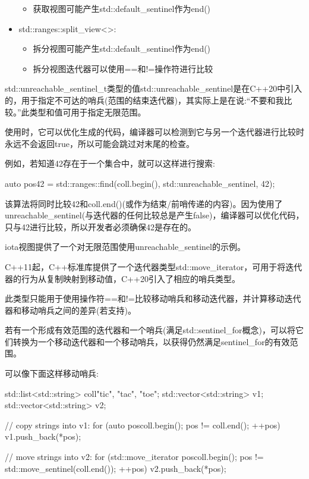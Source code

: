 \begin{itemize}
\begin{itemize}
\item
获取视图可能产生std::default\_sentinel作为end()
\end{itemize}

\item
std::ranges::split\_view<>:

\begin{itemize}
\item
拆分视图可能产生std::default\_sentinel作为end()

\item
拆分视图迭代器可以使用==和!=操作符进行比较
\end{itemize}
\end{itemize}


std::unreachable\_sentinel\_t类型的值std::unreachable\_sentinel是在C++20中引入的，用于指定不可达的哨兵(范围的结束迭代器)，其实际上是在说:“不要和我比较。”此类型和值可用于指定无限范围。

使用时，它可以优化生成的代码，编译器可以检测到它与另一个迭代器进行比较时永远不会返回true，所以可能会跳过对末尾的检查。

例如，若知道42存在于一个集合中，就可以这样进行搜索:

\begin{cpp}
auto pos42 = std::ranges::find(coll.begin(), std::unreachable_sentinel,
					42);
\end{cpp}

该算法将同时比较42和coll.end()(或作为结束/前哨传递的内容)。因为使用了unreachable\_sentinel(与迭代器的任何比较总是产生false)，编译器可以优化代码，只与42进行比较，所以开发者必须确保42是存在的。

iota视图提供了一个对无限范围使用unreachable\_sentinel的示例。


C++11起，C++标准库提供了一个迭代器类型std::move\_iterator，可用于将迭代器的行为从复制映射到移动值，C++20引入了相应的哨兵类型。

此类型只能用于使用操作符==和!=比较移动哨兵和移动迭代器，并计算移动迭代器和移动哨兵之间的差异(若支持)。

若有一个形成有效范围的迭代器和一个哨兵(满足std::sentinel\_for概念)，可以将它们转换为一个移动迭代器和一个移动哨兵，以获得仍然满足sentinel\_for的有效范围。

可以像下面这样移动哨兵:

\begin{cpp}
std::list<std::string> coll{"tic", "tac", "toe"};
std::vector<std::string> v1;
std::vector<std::string> v2;

// copy strings into v1:
for (auto pos{coll.begin()}; pos != coll.end(); ++pos) {
	v1.push_back(*pos);
}

// move strings into v2:
for (std::move_iterator pos{coll.begin()};
pos != std::move_sentinel(coll.end()); ++pos) {
	v2.push_back(*pos);
}
\end{cpp}

